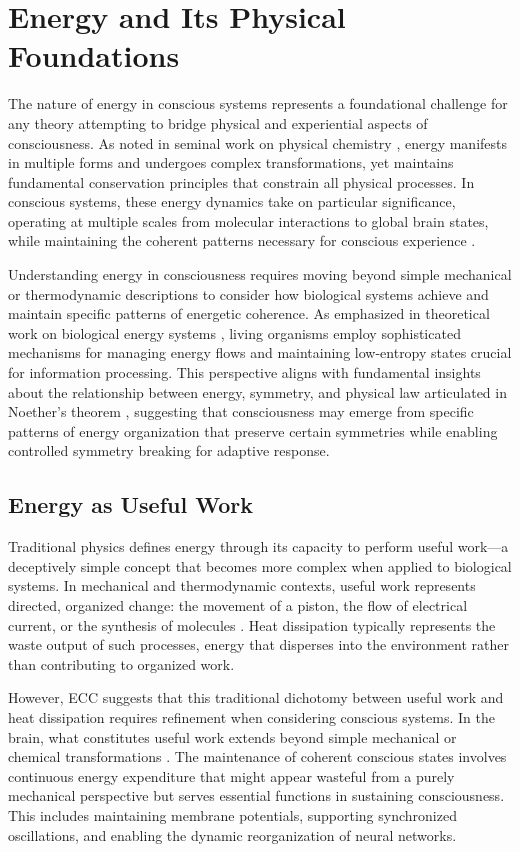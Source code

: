 \section{Energy and Its Physical Foundations}

The nature of energy in conscious systems represents a foundational challenge for any theory attempting to bridge physical and experiential aspects of consciousness. As noted in seminal work on physical chemistry \cite{Atkins2010}, energy manifests in multiple forms and undergoes complex transformations, yet maintains fundamental conservation principles that constrain all physical processes. In conscious systems, these energy dynamics take on particular significance, operating at multiple scales from molecular interactions to global brain states, while maintaining the coherent patterns necessary for conscious experience \cite{Demetrius2015}.

Understanding energy in consciousness requires moving beyond simple mechanical or thermodynamic descriptions to consider how biological systems achieve and maintain specific patterns of energetic coherence. As emphasized in theoretical work on biological energy systems \cite{Qian2007}, living organisms employ sophisticated mechanisms for managing energy flows and maintaining low-entropy states crucial for information processing. This perspective aligns with fundamental insights about the relationship between energy, symmetry, and physical law articulated in Noether's theorem \cite{Kosmann-Schwarzbach2011}, suggesting that consciousness may emerge from specific patterns of energy organization that preserve certain symmetries while enabling controlled symmetry breaking for adaptive response.

\subsection{Energy as Useful Work}

Traditional physics defines energy through its capacity to perform useful work—a deceptively simple concept that becomes more complex when applied to biological systems. In mechanical and thermodynamic contexts, useful work represents directed, organized change: the movement of a piston, the flow of electrical current, or the synthesis of molecules \cite{Atkins2010}. Heat dissipation typically represents the waste output of such processes, energy that disperses into the environment rather than contributing to organized work.

However, ECC suggests that this traditional dichotomy between useful work and heat dissipation requires refinement when considering conscious systems. In the brain, what constitutes useful work extends beyond simple mechanical or chemical transformations \cite{Qian2007}. The maintenance of coherent conscious states involves continuous energy expenditure that might appear wasteful from a purely mechanical perspective but serves essential functions in sustaining consciousness. This includes maintaining membrane potentials, supporting synchronized oscillations, and enabling the dynamic reorganization of neural networks.

